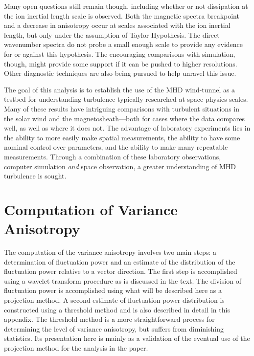 \documentclass[aip,prl,amsmath,amssymb,reprint,superscriptaddress]{revtex4-1} %
\begin{document}
Many open questions still remain though, including whether or not dissipation at the ion inertial length scale is observed. Both the magnetic spectra breakpoint and a decrease in anisotropy occur at scales associated with the ion inertial length, but only under the assumption of Taylor Hypothesis. The direct wavenumber spectra do not probe a small enough scale to provide any evidence for or against this hypothesis. The encouraging comparisons with simulation, though, might provide some support if it can be pushed to higher resolutions. Other diagnostic techniques are also being pursued to help unravel this issue.

The goal of this analysis is to establish the use of the MHD wind-tunnel as a testbed for understanding turbulence typically researched at space physics scales. Many of these results have intriguing comparisons with turbulent situations in the solar wind and the magnetosheath---both for cases where the data compares well, as well as where it does not. The advantage of laboratory experiments lies in the ability to more easily make spatial measurements, the ability to have some nominal control over parameters, and the ability to make many repeatable measurements. Through a combination of these laboratory observations, computer simulation {\it and} space observation, a greater understanding of MHD turbulence is sought.

\appendix

\section{Computation of Variance Anisotropy}\label{sec:projection}

The computation of the variance anisotropy involves two main steps: a determination of fluctuation power and an estimate of the distribution of the fluctuation power relative to a vector direction. The first step is accomplished using a wavelet transform procedure as is discussed in the text. The division of fluctuation power is accomplished using what will be described here as a projection method. A second estimate of fluctuation power distribution is constructed using a threshold method and is also described in detail in this appendix. The threshold method is a more straightforward process for determining the level of variance anisotropy, but suffers from diminishing statistics. Its presentation here is mainly as a validation of the eventual use of the projection method for the analysis in the paper. 
\end{document}
